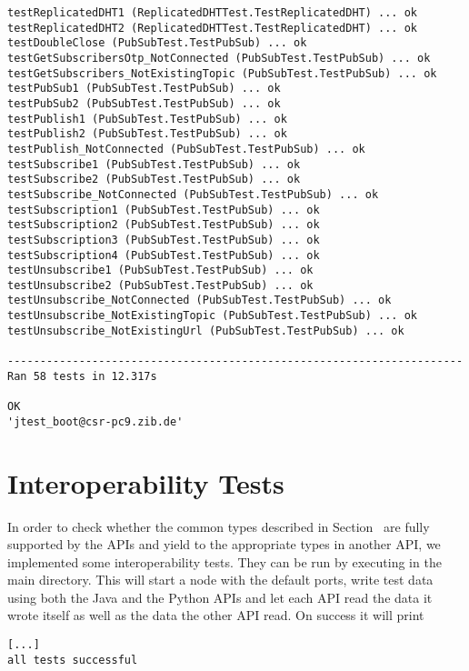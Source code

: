 \begin{lstlisting}[language={}]
testReplicatedDHT1 (ReplicatedDHTTest.TestReplicatedDHT) ... ok
testReplicatedDHT2 (ReplicatedDHTTest.TestReplicatedDHT) ... ok
testDoubleClose (PubSubTest.TestPubSub) ... ok
testGetSubscribersOtp_NotConnected (PubSubTest.TestPubSub) ... ok
testGetSubscribers_NotExistingTopic (PubSubTest.TestPubSub) ... ok
testPubSub1 (PubSubTest.TestPubSub) ... ok
testPubSub2 (PubSubTest.TestPubSub) ... ok
testPublish1 (PubSubTest.TestPubSub) ... ok
testPublish2 (PubSubTest.TestPubSub) ... ok
testPublish_NotConnected (PubSubTest.TestPubSub) ... ok
testSubscribe1 (PubSubTest.TestPubSub) ... ok
testSubscribe2 (PubSubTest.TestPubSub) ... ok
testSubscribe_NotConnected (PubSubTest.TestPubSub) ... ok
testSubscription1 (PubSubTest.TestPubSub) ... ok
testSubscription2 (PubSubTest.TestPubSub) ... ok
testSubscription3 (PubSubTest.TestPubSub) ... ok
testSubscription4 (PubSubTest.TestPubSub) ... ok
testUnsubscribe1 (PubSubTest.TestPubSub) ... ok
testUnsubscribe2 (PubSubTest.TestPubSub) ... ok
testUnsubscribe_NotConnected (PubSubTest.TestPubSub) ... ok
testUnsubscribe_NotExistingTopic (PubSubTest.TestPubSub) ... ok
testUnsubscribe_NotExistingUrl (PubSubTest.TestPubSub) ... ok

----------------------------------------------------------------------
Ran 58 tests in 12.317s

OK
'jtest_boot@csr-pc9.zib.de'
\end{lstlisting}

\section{Interoperability Tests}
In order to check whether the common types described in
Section~ are fully supported by the APIs
and yield to the appropriate types in another API, we implemented some
interoperability tests. They can be run by executing 
in the main directory.
This will start a \scalaris{} node with the default ports, write test data using
both the Java and the Python APIs and let each API read the data it wrote
itself as well as the data the other API read. On success it will print

\begin{lstlisting}[language={}]
%> make interop-test
[...]
all tests successful
\end{lstlisting}
